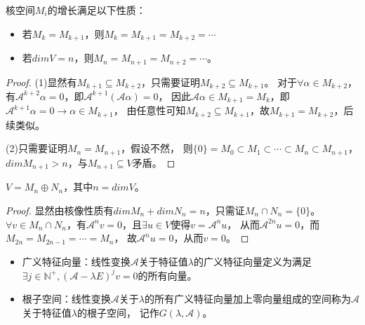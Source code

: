 \begin{lemma}[核空间增长]
  核空间$M_i$的增长满足以下性质：
  \begin{itemize}
  \item 若$M_k = M_{k+1}$，则$M_k = M_{k+1} = M_{k+2} = \cdots$
  \item 若$dim V = n$，则$M_n = M_{n+1} = M_{n+2} = \cdots$。
  \end{itemize}
\end{lemma}

\begin{proof}
  (1)显然有$M_{k+1} \subseteq M_{k+2}$，只需要证明$M_{k+2} \subseteq M_{k+1}$。
  对于$\forall \alpha \in M_{k+2}$，有$\mathcal{A}^{k+2}\alpha = 0$，即$\mathcal{A}^{k+1}( \mathcal{A}\alpha) = 0$，
  因此$\mathcal{A} \alpha \in M_{k+1} = M_k$，即$\mathcal{A}^{k+1}\alpha = 0 \rightarrow \alpha \in M_{k+1}$，
  由任意性可知$M_{k+2} \subseteq M_{k+1}$，故$M_{k+1} = M_{k+2}$，后续类似。

  (2)只需要证明$M_n = M_{n+1}$，假设不然，
  则$\{0\} = M_0 \subset M_1 \subset \cdots \subset M_n \subset M_{n+1}$，$dim M_{n+1} > n$，与$M_{n+1} \subseteq V$矛盾。
\end{proof}

\begin{theorem}[幂次变换核像分解] \label{thm:根子空间核像分解}
  $V = M_n \oplus N_n$，其中$n = dim V$。
\end{theorem}

\begin{proof}
  显然由核像性质有$dim M_n + dim N_n = n$，只需证$M_n \cap N_n = \{0\}$。
  $\forall v \in M_n \cap N_n$，有$\mathcal{A}^n v = 0$，且$\exists u \in V$使得$v = \mathcal{A}^n u$，
  从而$\mathcal{A}^{2n} u = 0$，而$M_{2n} = M_{2n-1} = \cdots = M_n$，
  故$\mathcal{A}^n u = 0$，从而$v = 0$。
\end{proof}

\begin{definition}
  \begin{itemize}
  \item 广义特征向量：线性变换$\mathcal{A}$关于特征值$\lambda$的广义特征向量定义为满足$\exists j \in \mathbb{N}^+, ( \mathcal{A} - \lambda E)^j v = 0$的所有向量。
  \item  根子空间：线性变换$\mathcal{A}$关于$\lambda$的所有广义特征向量加上零向量组成的空间称为$\mathcal{A}$关于特征值$\lambda$的根子空间，
    记作$G(\lambda, \mathcal{A})$。
  \end{itemize}
\end{definition}

